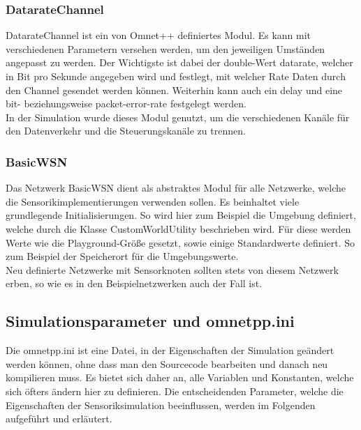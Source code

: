 \subsubsection{DatarateChannel}

DatarateChannel ist ein von Omnet++ definiertes Modul. Es kann mit verschiedenen Parametern versehen werden, um den jeweiligen Umständen angepasst zu werden. Der Wichtigste ist dabei der double-Wert datarate, welcher in Bit pro Sekunde angegeben wird und festlegt, mit welcher Rate Daten durch den Channel gesendet werden können. Weiterhin kann auch ein delay und eine bit- beziehungsweise packet-error-rate festgelegt werden.\\
In der Simulation wurde dieses Modul genutzt, um die verschiedenen Kanäle für den Datenverkehr und die Steuerungskanäle zu trennen.

\subsubsection{BasicWSN}

Das Netzwerk BasicWSN dient als abstraktes Modul für alle Netzwerke, welche die Sensorikimplementierungen verwenden sollen. Es beinhaltet viele grundlegende Initialisierungen. So wird hier zum Beispiel die Umgebung definiert, welche durch die Klasse CustomWorldUtility beschrieben wird. Für diese werden Werte wie die Playground-Größe gesetzt, sowie einige Standardwerte definiert. So zum Beispiel der Speicherort für die Umgebungswerte.\\
Neu definierte Netzwerke mit Sensorknoten sollten stets von diesem Netzwerk erben, so wie es in den Beispielnetzwerken auch der Fall ist.

\subsection{Simulationsparameter und omnetpp.ini}

Die omnetpp.ini ist eine Datei, in der Eigenschaften der Simulation geändert werden können, ohne dass man den Sourcecode bearbeiten und danach neu kompilieren muss. Es bietet sich daher an, alle Variablen und Konstanten, welche sich öfters ändern hier zu definieren. Die entscheidenden Parameter, welche die Eigenschaften der Sensoriksimulation beeinflussen, werden im Folgenden aufgeführt und erläutert.

